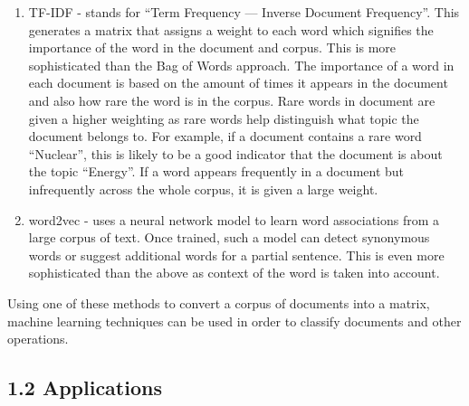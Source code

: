 \documentclass[
]{article}
\begin{document}
\begin{enumerate}
\def\labelenumi{\arabic{enumi}.}
\setcounter{enumi}{1}
\item
  TF-IDF - stands for ``Term Frequency --- Inverse Document Frequency''.
  This generates a matrix that assigns a weight to each word which
  signifies the importance of the word in the document and corpus. This
  is more sophisticated than the Bag of Words approach. The importance
  of a word in each document is based on the amount of times it appears
  in the document and also how rare the word is in the corpus. Rare
  words in document are given a higher weighting as rare words help
  distinguish what topic the document belongs to. For example, if a
  document contains a rare word ``Nuclear'', this is likely to be a good
  indicator that the document is about the topic ``Energy''. If a word
  appears frequently in a document but infrequently across the whole
  corpus, it is given a large weight.
\item
  word2vec - uses a neural network model to learn word associations from
  a large corpus of text. Once trained, such a model can detect
  synonymous words or suggest additional words for a partial sentence.
  This is even more sophisticated than the above as context of the word
  is taken into account.
\end{enumerate}

Using one of these methods to convert a corpus of documents into a
matrix, machine learning techniques can be used in order to classify
documents and other operations.

\hypertarget{applications}{%
\subsection{1.2 Applications}\label{applications}}
\end{document}
